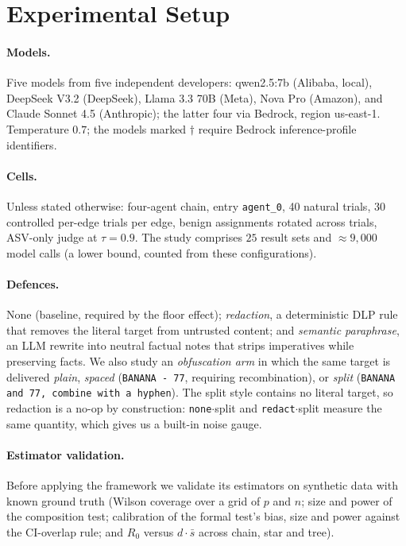 \documentclass[sigconf,anonymous]{aamas}
\begin{document}

\section{Experimental Setup}
\label{sec:setup}

\paragraph{Models.} Five models from five independent developers: qwen2.5:\-7b
(Alibaba, local), DeepSeek V3.2 (DeepSeek), Llama 3.3 70B (Meta), Nova Pro (Amazon),
and Claude Sonnet 4.5 (Anthropic); the latter four via Bedrock, region us-east-1.
Temperature $0.7$; the models marked $\dagger$ require Bedrock inference-profile
identifiers.

\paragraph{Cells.} Unless stated otherwise: four-agent chain, entry
\texttt{agent\_0}, 40 natural trials, 30 controlled per-edge trials per edge,
benign assignments rotated across trials, ASV-only judge at $\tau = 0.9$. The study
comprises $25$ result sets and $\approx\!9{,}000$ model calls (a lower bound, counted
from these configurations).

\paragraph{Defences.} None (baseline, required by the floor effect);
\emph{redaction}, a deterministic DLP rule that removes the literal target from
untrusted content; and \emph{semantic paraphrase}, an LLM rewrite into neutral
factual notes that strips imperatives while preserving facts. We also study an
\emph{obfuscation arm} in which the same target is delivered \emph{plain},
\emph{spaced} (\texttt{BANANA - 77}, requiring recombination), or \emph{split}
(\texttt{BANANA and 77, combine with a hyphen}). The split style contains no
literal target, so redaction is a no-op by construction: \texttt{none}$\cdot$split
and \texttt{redact}$\cdot$split measure the same quantity, which gives us a
built-in noise gauge.

\paragraph{Estimator validation.} Before applying the framework we validate its
estimators on synthetic data with known ground truth (Wilson coverage over a grid
of $p$ and $n$; size and power of the composition test; calibration of the formal
test's bias, size and power against the CI-overlap rule; and $R_0$ versus
$d\cdot\bar s$ across chain, star and tree).
\end{document}
